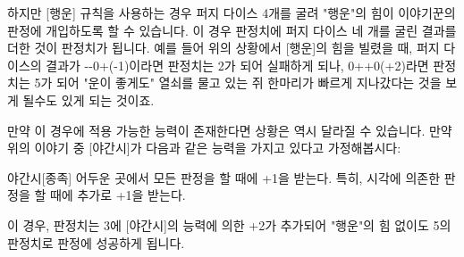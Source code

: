 \documentclass{report}
\begin{document}
	하지만 [행운] 규칙을 사용하는 경우 퍼지 다이스 4개를 굴려 "행운"의 힘이 이야기꾼의 판정에 개입하도록 할 수 있습니다. 이 경우 판정치에 퍼지 다이스 네 개를 굴린 결과를 더한 것이 판정치가 됩니다. 예를 들어 위의 상황에서 [행운]의 힘을 빌렸을 때, 퍼지 다이스의 결과가 -{}-0+(-1)이라면 판정치는 2가 되어 실패하게 되나, 0++0(+2)라면 판정치는 5가 되어 "운이 좋게도" 열쇠를 물고 있는 쥐 한마리가 빠르게 지나갔다는 것을 보게 될수도 있게 되는 것이죠.
	
	만약 이 경우에 적용 가능한 능력이 존재한다면 상황은 역시 달라질 수 있습니다. 만약 위의 이야기 중 [야간시]가 다음과 같은 능력을 가지고 있다고 가정해봅시다:
	\begin{story}{야간시}{[종족]}
		어두운 곳에서 모든 판정을 할 때에 +1을 받는다. 특히, 시각에 의존한 판정을 할 때에 추가로 +1을 받는다.
	\end{story}
	이 경우, 판정치는 3에 [야간시]의 능력에 의한 +2가 추가되어 "행운"의 힘 없이도 5의 판정치로 판정에 성공하게 됩니다.
	
\end{document}
